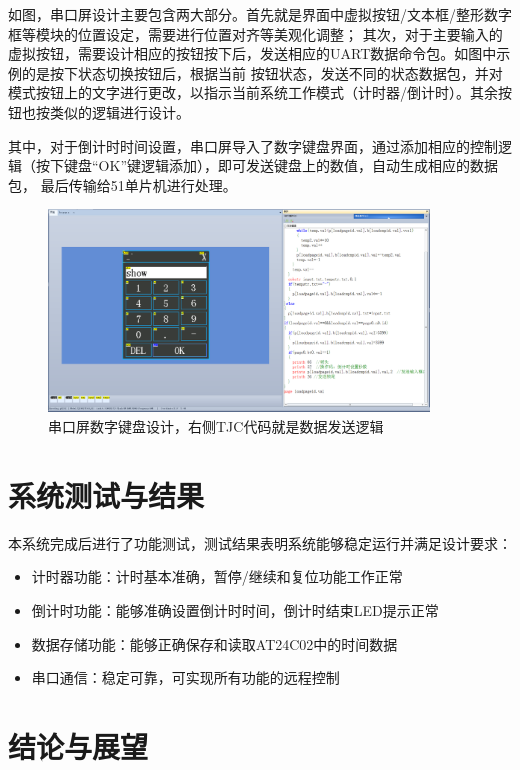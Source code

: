 \documentclass[12pt,hyperref,a4paper,UTF8]{ctexart}
\begin{document}
如图，串口屏设计主要包含两大部分。首先就是界面中虚拟按钮/文本框/整形数字框等模块的位置设定，需要进行位置对齐等美观化调整；
其次，对于主要输入的虚拟按钮，需要设计相应的按钮按下后，发送相应的UART数据命令包。如图中示例的是按下状态切换按钮后，根据当前
按钮状态，发送不同的状态数据包，并对模式按钮上的文字进行更改，以指示当前系统工作模式（计时器/倒计时）。其余按钮也按类似的逻辑进行设计。

其中，对于倒计时时间设置，串口屏导入了数字键盘界面，通过添加相应的控制逻辑（按下键盘“OK”键逻辑添加），即可发送键盘上的数值，自动生成相应的数据包，
最后传输给51单片机进行处理。

\begin{figure}[H]
    \centering
    \includegraphics[width=0.9\textwidth]{figures/5.png} %
    \caption{串口屏数字键盘设计，右侧TJC代码就是数据发送逻辑}
    \label{fig:hardware-connection}
\end{figure}


\section{系统测试与结果}

本系统完成后进行了功能测试，测试结果表明系统能够稳定运行并满足设计要求：

\begin{itemize}
  \item 计时器功能：计时基本准确，暂停/继续和复位功能工作正常
  \item 倒计时功能：能够准确设置倒计时时间，倒计时结束LED提示正常
  \item 数据存储功能：能够正确保存和读取AT24C02中的时间数据
  \item 串口通信：稳定可靠，可实现所有功能的远程控制
\end{itemize}

\section{结论与展望}
\end{document}
